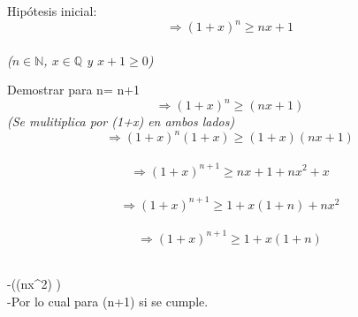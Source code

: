 \documentclass{article}
\begin{document}
\centering Hipótesis inicial:$$\Rightarrow (1+x)^n\geq nx+1$$\\
\textit{($n\in \mathbb{N}$, $x\in \mathbb{Q}$ y $x+1\geq 0$)}

\raggedright Demostrar para  n= n+1 \\ 
$$\Rightarrow (1+x)^{n}\geq (nx+1) $$\centering\textit{(Se mulitiplica por (1+x) en ambos lados)}\\
$$\Rightarrow (1+x)^n(1+x)\geq (1+x)(nx+1) $$ \\
$$\Rightarrow (1+x)^{n+1}\geq nx+1+nx^2+x$$\\

\centering $$\Rightarrow (1+x)^{n+1}\geq 1+x(1+n)+nx^2$$\\

$$\Rightarrow (1+x)^{n+1}\geq 1+x(1+n)$$\\ 

\raggedright -((nx^2) )
\\ 
-Por lo cual para (n+1) si se cumple.\\
\end{document}
